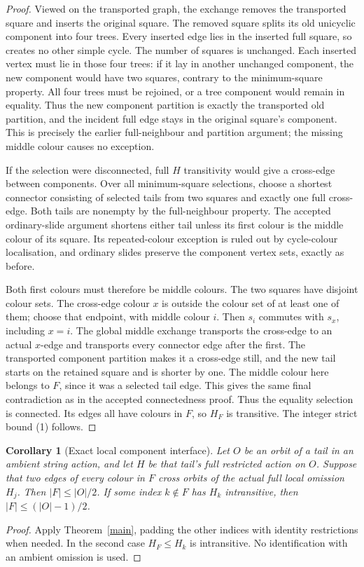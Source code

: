 \documentclass[11pt,a4paper]{article}
\newtheorem{corollary}[theorem]{Corollary}
\begin{document}
\begin{proof}
Viewed on the transported graph, the exchange removes the transported
square and inserts the original square. The removed square splits
its old unicyclic component into four trees. Every inserted edge
lies in the inserted full square, so creates no other simple cycle.
The number of squares is unchanged. Each inserted vertex must lie
in those four trees: if it lay in another unchanged component, the
new component would have two squares, contrary to the minimum-square
property. All four trees must be rejoined, or a tree component would
remain in equality. Thus the new component partition is exactly the
transported old partition, and the incident full edge stays in the
original square's component. This is precisely the earlier
full-neighbour and partition argument; the missing middle colour
causes no exception.

If the selection were disconnected, full $H$ transitivity would
give a cross-edge between components. Over all minimum-square
selections, choose a shortest connector consisting of selected tails
from two squares and exactly one full cross-edge. Both tails are
nonempty by the full-neighbour property. The accepted ordinary-slide
argument shortens either tail unless its first colour is the middle
colour of its square. Its repeated-colour exception is ruled out by
cycle-colour localisation, and ordinary slides preserve the component
vertex sets, exactly as before.

Both first colours must therefore be middle colours. The two squares
have disjoint colour sets. The cross-edge colour $x$ is outside the
colour set of at least one of them; choose that endpoint, with middle
colour $i$. Then $s_i$ commutes with $s_x$, including $x=i$.
The global middle exchange transports the cross-edge to an actual
$x$-edge and transports every connector edge after the first. The
transported component partition makes it a cross-edge still, and
the new tail starts on the retained square and is shorter by one.
The middle colour here belongs to $F$, since it was a selected tail
edge. This gives the same final contradiction as in the accepted
connectedness proof. Thus the equality selection is connected.
Its edges all have colours in $F$, so $H_F$ is transitive.
The integer strict bound (1) follows.
\end{proof}

\begin{corollary}[Exact local component interface]
Let $O$ be an orbit of a tail in an ambient string action, and let
$H$ be that tail's full restricted action on $O$. Suppose that two edges of every colour in $F$ cross
orbits of the actual full local omission $H_j$. Then
$|F|\leq |O|/2$. If some index $k\notin F$ has $H_k$
intransitive, then $|F|\leq(|O|-1)/2$.
\end{corollary}
\begin{proof}
Apply Theorem~\ref{main}, padding the other indices with identity
restrictions when needed. In the second case $H_F\leq H_k$ is
intransitive. No identification with an ambient omission is used.
\end{proof}
\end{document}
